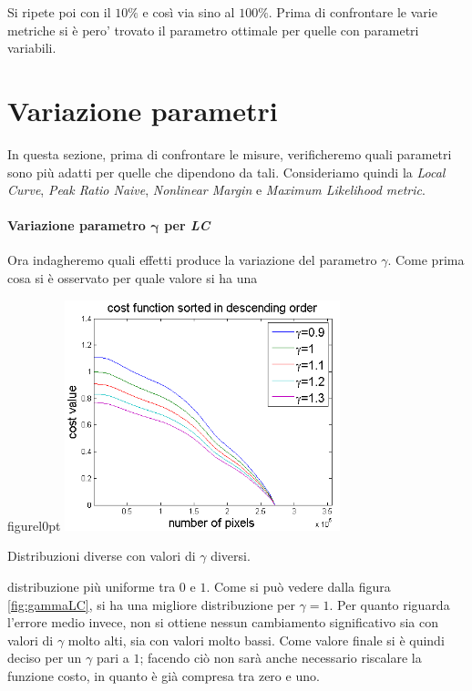 \documentclass[12pt]{report}
\begin{document}
		\noindent Si ripete poi con il $10\%$ e così via sino al $100\%$. Prima di confrontare le varie metriche si è pero' trovato il parametro ottimale per quelle con parametri variabili.
		
		\section{Variazione parametri}
		\label{sec:parametri}
		
			In questa sezione, prima di confrontare le misure, verificheremo quali parametri sono più adatti per quelle che dipendono da tali. Consideriamo quindi la \textit{Local Curve}, \textit{Peak Ratio Naive}, \textit{Nonlinear Margin}  e \textit{Maximum Likelihood metric}.
		
			\paragraph{Variazione parametro $\bm{\gamma}$ per \textit{LC}}
			\label{par:gamma}
		
				Ora indagheremo quali effetti produce la variazione del parametro $\gamma$. Come prima cosa si è osservato per quale valore si ha una
		
		
				\begin{wrapfloat}{figure}{l}{0pt}
					\includegraphics[width=0.6\textwidth]{./figures/gamma_LC.png}
					\caption{Distribuzioni diverse con valori di $\gamma$ diversi.}
					\label{fig:gammaLC}
				\end{wrapfloat} 
		
				\noindent distribuzione più uniforme tra $0$ e $1$. Come si può vedere dalla figura \ref{fig:gammaLC}, si ha una migliore distribuzione per $\gamma=1$. Per quanto riguarda l'errore medio invece, non si ottiene nessun cambiamento significativo sia con valori di $\gamma$ molto alti, sia con valori molto bassi. Come valore finale si è quindi deciso per un $\gamma$ pari a $1$; facendo ciò non sarà anche necessario riscalare la funzione costo, in quanto è già compresa tra zero e uno. \newline \newline \newline
		
\end{document}
